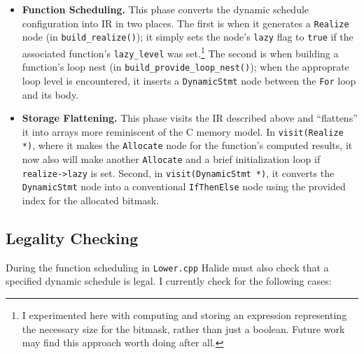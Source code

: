 \documentclass{article}
\begin{document}
\begin{itemize}
	\item {\bf Function Scheduling.} This phase converts the dynamic schedule configuration into IR in two places. The first is when it generates a \texttt{Realize} node (in \texttt{build\_realize()}); it simply sets the node's \texttt{lazy} flag to \texttt{true} if the associated function's \texttt{lazy\_level} was set.\footnote{
	I experimented here with computing and storing an expression representing the necessary size for the bitmask, rather than just a boolean. Future work may find this approach worth doing after all.}
	The second is when building a function's loop nest (in \texttt{build\_provide\_loop\_nest()}); when the approprate loop level is encountered, it inserts a \texttt{DynamicStmt} node between the \texttt{For} loop and its body.
	\item {\bf Storage Flattening.} This phase visits the IR described above and ``flattens'' it into arrays more reminiscent of the C memory model. In \texttt{visit(Realize *)}, where it makes the \texttt{Allocate} node for the function's computed results, it now also will make another \texttt{Allocate} and a brief initialization loop if \texttt{realize->lazy} is set. Second, in \texttt{visit(DynamicStmt *)}, it converts the \texttt{DynamicStmt} node into a conventional \texttt{IfThenElse} node using the provided index for the allocated bitmask.
\end{itemize}

\subsection{Legality Checking}

During the function scheduling in \texttt{Lower.cpp} Halide must also check that a specified dynamic schedule is legal. I currently check for the following cases:
\end{document}
